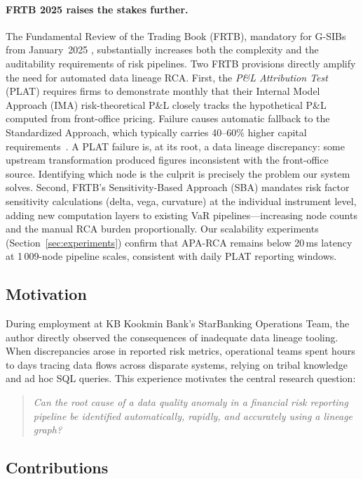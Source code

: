 \documentclass{article}
\newcommand{\aparca}{\textsc{APA-RCA}}
\begin{document}
\paragraph{FRTB 2025 raises the stakes further.}
The Fundamental Review of the Trading Book (FRTB), mandatory for G-SIBs from
January~2025 \cite{bis2019frtb}, substantially increases both the complexity
and the auditability requirements of risk pipelines.
Two FRTB provisions directly amplify the need for automated data lineage RCA.
First, the \emph{P\&L Attribution Test} (PLAT) requires firms to demonstrate
monthly that their Internal Model Approach (IMA) risk-theoretical P\&L closely
tracks the hypothetical P\&L computed from front-office pricing.
Failure causes automatic fallback to the Standardized Approach, which typically
carries 40--60\% higher capital requirements~\cite{bis2019frtb}.
A PLAT failure is, at its root, a data lineage discrepancy: some upstream
transformation produced figures inconsistent with the front-office source.
Identifying which node is the culprit is precisely the problem our system solves.
Second, FRTB's Sensitivity-Based Approach (SBA) mandates risk factor sensitivity
calculations (delta, vega, curvature) at the individual instrument level, adding
new computation layers to existing VaR pipelines---increasing node counts and
the manual RCA burden proportionally.
Our scalability experiments (Section~\ref{sec:experiments}) confirm that
\aparca{} remains below 20\,ms latency at 1\,009-node pipeline scales,
consistent with daily PLAT reporting windows.

\subsection{Motivation}

During employment at KB Kookmin Bank's StarBanking Operations Team, the author
directly observed the consequences of inadequate data lineage tooling.
When discrepancies arose in reported risk metrics, operational teams spent
hours to days tracing data flows across disparate systems, relying on tribal
knowledge and ad hoc SQL queries.
This experience motivates the central research question:

\begin{quote}
\emph{Can the root cause of a data quality anomaly in a financial risk
reporting pipeline be identified automatically, rapidly, and accurately
using a lineage graph?}
\end{quote}

\subsection{Contributions}
\end{document}

